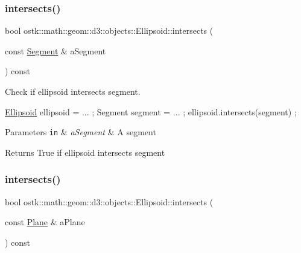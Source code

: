 \subsubsection{\texorpdfstring{intersects()}{intersects()}\hspace{0.1cm}{\footnotesize\ttfamily [5/10]}}
{\footnotesize\ttfamily bool ostk\+::math\+::geom\+::d3\+::objects\+::\+Ellipsoid\+::intersects (\begin{DoxyParamCaption}\item[{const \hyperlink{classostk_1_1math_1_1geom_1_1d3_1_1objects_1_1_segment}{Segment} \&}]{a\+Segment }\end{DoxyParamCaption}) const}



Check if ellipsoid intersects segment. 


\begin{DoxyCode}
\hyperlink{classostk_1_1math_1_1geom_1_1d3_1_1objects_1_1_ellipsoid_acd84276f65a14db12623402a411712b7}{Ellipsoid} ellipsoid = ... ;
Segment segment = ... ;
ellipsoid.intersects(segment) ;
\end{DoxyCode}



\begin{DoxyParams}[1]{Parameters}
\mbox{\tt in}  & {\em a\+Segment} & A segment \\
\hline
\end{DoxyParams}
\begin{DoxyReturn}{Returns}
True if ellipsoid intersects segment 
\end{DoxyReturn}
\mbox{\label{classostk_1_1math_1_1geom_1_1d3_1_1objects_1_1_ellipsoid_a996a2dfe962cdb5dd5b16e3ee9bfdf62}} 
\subsubsection{\texorpdfstring{intersects()}{intersects()}\hspace{0.1cm}{\footnotesize\ttfamily [6/10]}}
{\footnotesize\ttfamily bool ostk\+::math\+::geom\+::d3\+::objects\+::\+Ellipsoid\+::intersects (\begin{DoxyParamCaption}\item[{const \hyperlink{classostk_1_1math_1_1geom_1_1d3_1_1objects_1_1_plane}{Plane} \&}]{a\+Plane }\end{DoxyParamCaption}) const}



